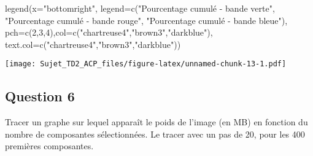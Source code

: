 \documentclass[
]{article}
\newenvironment{Shaded}{\begin{snugshade}}{\end{snugshade}}
\newcommand{\AttributeTok}[1]{\textcolor[rgb]{0.77,0.63,0.00}{#1}}
\newcommand{\DecValTok}[1]{\textcolor[rgb]{0.00,0.00,0.81}{#1}}
\newcommand{\FunctionTok}[1]{\textcolor[rgb]{0.00,0.00,0.00}{#1}}
\newcommand{\NormalTok}[1]{#1}
\newcommand{\StringTok}[1]{\textcolor[rgb]{0.31,0.60,0.02}{#1}}
\begin{document}
\begin{Shaded}
\begin{Highlighting}[]
\FunctionTok{legend}\NormalTok{(}\AttributeTok{x=}\StringTok{"bottomright"}\NormalTok{,}
       \AttributeTok{legend=}\FunctionTok{c}\NormalTok{(}\StringTok{"Pourcentage cumulé {-} bande verte"}\NormalTok{,}
                \StringTok{"Pourcentage cumulé {-} bande rouge"}\NormalTok{,}
                \StringTok{"Pourcentage cumulé {-} bande bleue"}\NormalTok{),}
       \AttributeTok{pch=}\FunctionTok{c}\NormalTok{(}\DecValTok{2}\NormalTok{,}\DecValTok{3}\NormalTok{,}\DecValTok{4}\NormalTok{),}\AttributeTok{col=}\FunctionTok{c}\NormalTok{(}\StringTok{"chartreuse4"}\NormalTok{,}\StringTok{"brown3"}\NormalTok{,}\StringTok{"darkblue"}\NormalTok{),}
       \AttributeTok{text.col=}\FunctionTok{c}\NormalTok{(}\StringTok{"chartreuse4"}\NormalTok{,}\StringTok{"brown3"}\NormalTok{,}\StringTok{"darkblue"}\NormalTok{))}
\end{Highlighting}
\end{Shaded}

\texttt{[image: Sujet\_TD2\_ACP\_files/figure-latex/unnamed-chunk-13-1.pdf]}

\hypertarget{question-6}{%
\subsection{Question 6}\label{question-6}}

Tracer un graphe sur lequel apparaît le poids de l'image (en MB) en
fonction du nombre de composantes sélectionnées. Le tracer avec un pas
de 20, pour les 400 premières composantes.
\end{document}

